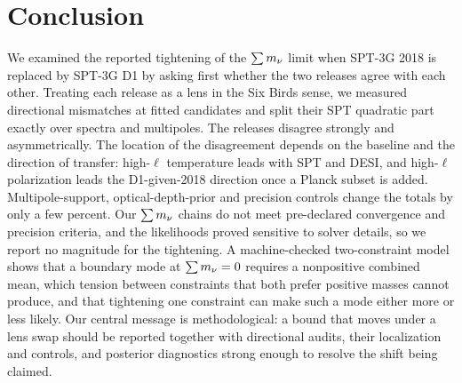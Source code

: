 \section{Conclusion}
\label{sec:conclusion}

We examined the reported tightening of the $\sum m_\nu$ limit when SPT-3G 2018 is replaced by SPT-3G D1 by asking first whether the two releases agree with each other. Treating each release as a lens in the Six Birds sense, we measured directional mismatches at fitted candidates and split their SPT quadratic part exactly over spectra and multipoles. The releases disagree strongly and asymmetrically. The location of the disagreement depends on the baseline and the direction of transfer: high-$\ell$ temperature leads with SPT and DESI, and high-$\ell$ polarization leads the D1-given-2018 direction once a Planck subset is added. Multipole-support, optical-depth-prior and precision controls change the totals by only a few percent. Our $\sum m_\nu$ chains do not meet pre-declared convergence and precision criteria, and the likelihoods proved sensitive to solver details, so we report no magnitude for the tightening. A machine-checked two-constraint model shows that a boundary mode at $\sum m_\nu=0$ requires a nonpositive combined mean, which tension between constraints that both prefer positive masses cannot produce, and that tightening one constraint can make such a mode either more or less likely. Our central message is methodological: a bound that moves under a lens swap should be reported together with directional audits, their localization and controls, and posterior diagnostics strong enough to resolve the shift being claimed.
